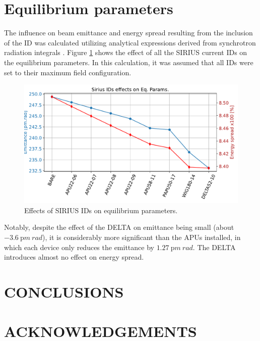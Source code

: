 \documentclass[a4paper,
               keeplastbox,   %
               ]{jacow}
\begin{document}
\section{Equilibrium parameters}
The influence on beam emittance and energy spread resulting from the inclusion of the ID was calculated utilizing analytical expressions derived from synchrotron radiation integrals \cite{Lee:1999}. Figure \ref{fig:eq_param} shows the effect of all the SIRIUS current IDs on the equilibrium parameters. In this calculation, it was assumed that all IDs were set to their maximum field configuration.

\begin{figure}[!h]
    \centering
   \includegraphics[width=\columnwidth]{eqparams.pdf}
   \caption{Effects of SIRIUS IDs on equilibrium parameters.}
   \label{fig:eq_param}
\end{figure}

Notably, despite the effect of the DELTA on emittance being small (about $\SI{-3.6}{\pico m~rad}$), it is considerably more significant than the APUs installed, in which each device only reduces the emittance by $\SI{1.27}{\pico m~rad}$. The DELTA introduces almost no effect on energy spread.

\section{CONCLUSIONS}


\section{ACKNOWLEDGEMENTS}
\end{document}
